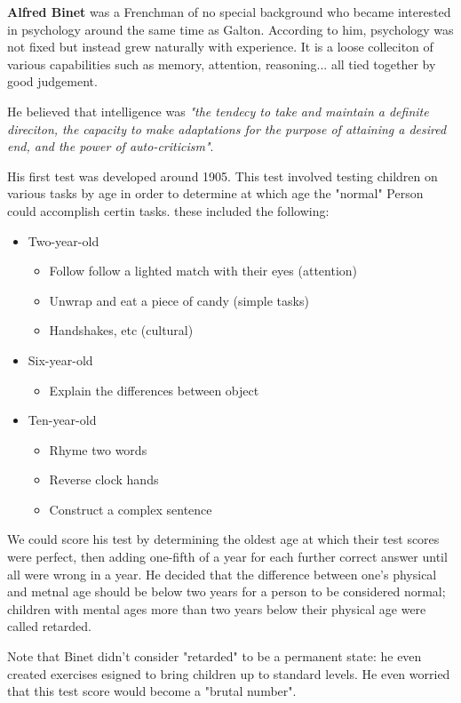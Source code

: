 \documentclass[12pt]{article}
\begin{document}
{\bf Alfred Binet} was a Frenchman of no special background who became interested in psychology around the same time as Galton. According to him, psychology was not fixed but instead grew naturally with experience. It is a loose colleciton of various capabilities such as memory, attention, reasoning... all tied together by good judgement.

He believed that intelligence was {\it "the tendecy to take and maintain a definite direciton, the capacity to make adaptations for the purpose of attaining a desired end, and the power of auto-criticism"}.

His first test was developed around 1905. This test involved testing children on various tasks by age in order to determine at which age the "normal" Person could accomplish certin tasks. these included the following:
\begin{itemize}
\item Two-year-old
\begin{itemize}
\item Follow follow a lighted match with their eyes (attention)
\item Unwrap and eat a piece of candy (simple tasks)
\item Handshakes, etc (cultural)
\end{itemize}
\item Six-year-old
\begin{itemize}
\item Explain the differences between object
\end{itemize}
\item Ten-year-old
\begin{itemize}
\item Rhyme two words
\item Reverse clock hands
\item Construct a complex sentence
\end{itemize}
\end{itemize}

We could score his test by determining the oldest age at which their test scores were perfect, then adding one-fifth of a year for each further correct answer until all were wrong in a year. He decided that the difference between one's physical and metnal age should be below two years for a person to be considered normal; children with mental ages more than two years below their physical age were called retarded.

Note that Binet didn't consider "retarded" to be a permanent state: he even created exercises esigned to bring children up to standard levels. He even worried that this test score would become a "brutal number".
\end{document}
